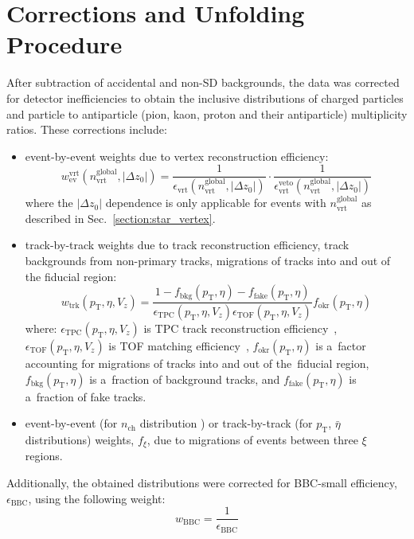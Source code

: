 \chapter{Corrections and Unfolding Procedure}\label{section:star_corrections}
After subtraction of accidental and non-SD backgrounds, the data was corrected for detector inefficiencies to obtain the inclusive distributions of charged particles and particle to antiparticle (pion, kaon, proton and their antiparticle) multiplicity ratios. These corrections include:
\begin{itemize}
	\item event-by-event weights due to vertex reconstruction efficiency:
\begin{equation}
w_\textrm{ev}^\textrm{vrt}\left(n_\textrm{vrt}^\textrm{global}, |\Delta z_0|\right)=\frac{1}{\epsilon_\textrm{vrt}\left(n_\textrm{vrt}^\textrm{global}, |\Delta z_0|\right)}\cdot\frac{1}{\epsilon_\textrm{vrt}^\textrm{veto}\left(n_\textrm{vrt}^\textrm{global}, |\Delta z_0|\right)}
\label{eq:vertexCorrection}
\end{equation}
where the 	$|\Delta z_0|$ dependence is only applicable for events with $n_\textrm{vrt}^\textrm{global}$ as described in Sec.~\ref{section:star_vertex}.
	\item track-by-track weights due to track reconstruction efficiency, track backgrounds from non-primary tracks, migrations of tracks into and out of the fiducial region:
\begin{equation}
w_\textrm{trk}\left(p_\textrm{T},\eta,V_{z}\right)=\frac{1-f_\textrm{bkg}\left(p_\textrm{T},\eta\right)-f_\textrm{fake}\left(p_\textrm{T},\eta\right)}{\epsilon_\textrm{TPC}\left(p_\textrm{T},\eta,V_{z}\right)\epsilon_\textrm{TOF}\left(p_\textrm{T},\eta,V_{z}\right)}f_\textrm{okr}\left(p_\textrm{T},\eta\right)
\label{eq:trackCorrection}
\end{equation}
where: $\epsilon_\textrm{TPC}\left(p_\textrm{T},\eta,V_{z}\right)$ is TPC track reconstruction efficiency~\cite{supplementaryNote}, $\epsilon_\textrm{TOF}\left(p_\textrm{T},\eta,V_{z}\right)$ is TOF matching efficiency~\cite{supplementaryNote}, $f_\textrm{okr}\left(p_\textrm{T},\eta\right)$ is a~factor accounting for migrations of tracks into and out of the~fiducial region, $f_\textrm{bkg}\left(p_\textrm{T},\eta\right)$ is a~fraction of background tracks, and $f_\textrm{fake}\left(p_\textrm{T},\eta\right)$ is a~fraction of fake tracks.
\item event-by-event (for $n_\textrm{ch}$ distribution ) or track-by-track (for $p_\textrm{T}$, $\bar{\eta}$ distributions) weights, $f_{\xi}$, due to migrations of events between three $\xi$ regions.
\end{itemize}
Additionally, the obtained distributions were corrected for BBC-small efficiency, $\epsilon_\textrm{BBC}$, using the following weight:
\begin{equation}
w_\textrm{BBC} = \frac{1}{\epsilon_\textrm{BBC}}
\label{eq:bbcCorrection}
\end{equation} 

